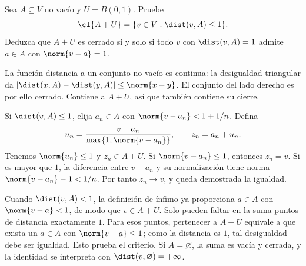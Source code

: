 \begin{ejercicio}
Sea $A\subseteq V$ no vacío y $U=\overline B(0,1)$. Pruebe
\[
 \cl{A+U}=\{v\in V:\dist(v,A)\leq1\}.
\]
Deduzca que $A+U$ es cerrado si y solo si todo $v$ con $\dist(v,A)=1$ admite $a\in A$ con $\norm{v-a}=1$.
\end{ejercicio}
\begin{solucion}
La función distancia a un conjunto no vacío es continua: la desigualdad triangular da $|\dist(x,A)-\dist(y,A)|\leq\norm{x-y}$. El conjunto del lado derecho es por ello cerrado. Contiene a $A+U$, así que también contiene su cierre.

Si $\dist(v,A)\leq1$, elija $a_n\in A$ con $\norm{v-a_n}<1+1/n$. Defina
\[
 u_n=\frac{v-a_n}{\max\{1,\norm{v-a_n}\}},\qquad z_n=a_n+u_n.
\]
Tenemos $\norm{u_n}\leq1$ y $z_n\in A+U$. Si $\norm{v-a_n}\leq1$, entonces $z_n=v$. Si es mayor que $1$, la diferencia entre $v-a_n$ y su normalización tiene norma $\norm{v-a_n}-1<1/n$. Por tanto $z_n\to v$, y queda demostrada la igualdad.

Cuando $\dist(v,A)<1$, la definición de ínfimo ya proporciona $a\in A$ con $\norm{v-a}<1$, de modo que $v\in A+U$. Solo pueden faltar en la suma puntos de distancia exactamente $1$. Para esos puntos, pertenecer a $A+U$ equivale a que exista un $a\in A$ con $\norm{v-a}\leq1$; como la distancia es $1$, tal desigualdad debe ser igualdad. Esto prueba el criterio. Si $A=\varnothing$, la suma es vacía y cerrada, y la identidad se interpreta con $\dist(v,\varnothing)=+\infty$.
\end{solucion}

